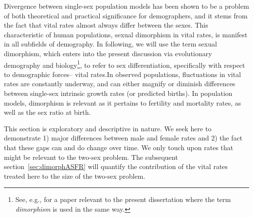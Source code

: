  \FloatBarrier
Divergence between single-sex population models has been shown to be a problem
of both theoretical and practical significance for demographers, and it stems from
the fact that vital rates almost always differ between the sexes.
This characteristic of human populations, sexual dimorphism in vital rates,
is manifest in all subfields of demography. In following, we will use the term
sexual dimorphism, which enters into the present discussion via evolutionary
demography and biology\footnote{See, e.g., \citet{caswell1986two} for a paper
relevant to the present dissertation where the term \textit{dimorphism} is used
in the same way.}, to refer to sex differentiation, specifically with respect to demographic forces-- vital rates.In observed populations, fluctuations in vital rates are constantly underway, and can either magnify or 
diminish differences between single-sex intrinsic growth rates (or predicted births). 
In population models, dimorphism is relevant as it pertains to fertility and mortality 
rates, as well as the sex ratio at birth.

This section is exploratory and descriptive in nature. We seek here to
demonstrate 1) major differences between male and female rates and 2) the fact
that these gaps can and do change over time. We only touch upon rates that might
be relevant to the two-sex problem. The subsequent section~\ref{sec:dimorphASFR}
will quantify the contribution of the vital rates treated here to the size of the two-sex
problem.
